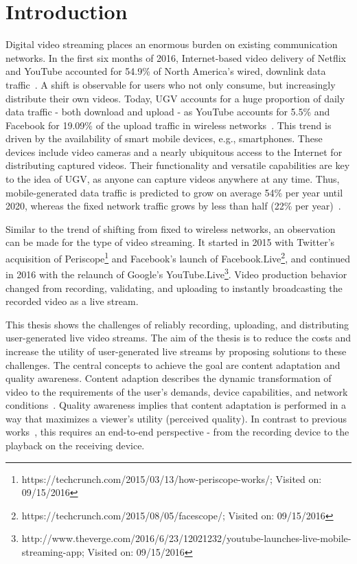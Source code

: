 \acresetall
\chapter{Introduction}\label{ch:intro}
Digital video streaming places an enormous burden on existing communication networks.
In the first six months of 2016, Internet-based video delivery of Netflix and YouTube accounted for 54.9\% of North America's wired, downlink data traffic~\cite{Sandvine2016}.
A shift is observable for users who not only consume, but increasingly distribute their own videos.
Today, \acf{UGV} accounts for a huge proportion of daily data traffic - both download and upload - as YouTube accounts for 5.5\% and Facebook for 19.09\% of the upload traffic in wireless networks~\cite{Sandvine2016}.
This trend is driven by the availability of smart mobile devices, e.g., smartphones.
These devices include video cameras and a nearly ubiquitous access to the Internet for distributing captured videos. 
Their functionality and versatile capabilities are key to the idea of \ac{UGV}, as anyone can capture videos anywhere at any time.
Thus, mobile-generated data traffic is predicted to grow on average 54\% per year until 2020, whereas the fixed network traffic grows by less than half (22\% per year)~\cite{Cisco2016}.

Similar to the trend of shifting from fixed to wireless networks, an observation can be made for the type of video streaming.
It started in 2015 with Twitter's acquisition of Periscope\footnote{https://techcrunch.com/2015/03/13/how-periscope-works/; Visited on: 09/15/2016} and Facebook's launch of Facebook.Live\footnote{https://techcrunch.com/2015/08/05/facescope/; Visited on: 09/15/2016}, and continued in 2016 with the relaunch of Google's YouTube.Live\footnote{http://www.theverge.com/2016/6/23/12021232/youtube-launches-live-mobile-streaming-app; Visited on: 09/15/2016}.
Video production behavior changed from recording, validating, and uploading to instantly broadcasting the recorded video as a live stream.
 
This thesis shows the challenges of reliably recording, uploading, and distributing user-generated live video streams.
The aim of the thesis is to reduce the costs and increase the utility of user-generated live streams by proposing solutions to these challenges.
The central concepts to achieve the goal are content adaptation and quality awareness.
Content adaption describes the dynamic transformation of video to the requirements of the user's demands, device capabilities, and network conditions~\cite{Rabin10}.
Quality awareness implies that content adaptation is performed in a way that maximizes a viewer's utility (perceived quality).
In contrast to previous works~\cite{Chen2015,Fu2015,Richerzhagen2016,Zhang2015}, this requires an end-to-end perspective - from the recording device to the playback on the receiving device.
 
